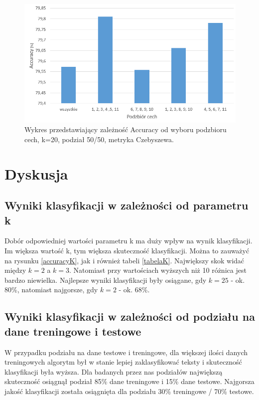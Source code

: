 \documentclass{classrep}
\begin{document}
\begin{figure}[h!]
    \centering
    \includegraphics[width=1\textwidth]{accuracyFeatures.png}
    \caption{Wykres przedstawiający zależność Accuracy od wyboru podzbioru cech, k=20, podział 50/50, metryka Czebyszewa.}
    \label{accuracyFeatures}
\end{figure}

\newpage
\section{Dyskusja} %
\subsection{Wyniki klasyfikacji w zależności od parametru k}
Dobór odpowiedniej wartości parametru k ma duży wpływ na wynik klasyfikacji. Im większa wartość k, tym większa skuteczność klasyfikacji. Można to zauważyć na rysunku \ref{accuracyK}, jak i również tabeli \ref{tabelaK}. Największy skok widać między $k=2$ a $k=3$. Natomiast przy wartościach wyższych niż 10 różnica jest bardzo niewielka. Najlepsze wyniki klasyfikacji były osiągane, gdy $k=25$ - ok. 80\%, natomiast najgorsze, gdy $k=2$ - ok. 68\%. 
\subsection{Wyniki klasyfikacji w zależności od podziału na dane treningowe i testowe}
W przypadku podziału na dane testowe i treningowe, dla większej ilości danych treningowych algorytm był w stanie lepiej zaklasyfikować teksty i skuteczność klasyfikacji była wyższa. Dla badanych przez nas podziałów największą skuteczność osiągnął podział 85\% dane treningowe i 15\% dane testowe. Najgorsza jakość klasyfikacji została osiągnięta dla podziału 30\% treningowe / 70\% testowe. 
\end{document}
